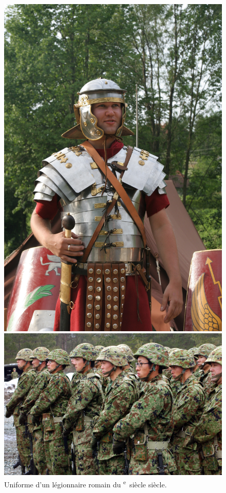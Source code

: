 \documentclass{article}
\newcommand{\cRM}[1]{\MakeUppercase{\romannumeral #1}}  %
\newcommand{\siecle}[1]{\cRM{#1}\textsuperscript{e}~siècle}
\begin{document}
\begin{center}
\begin{figure}[H]
\hfill
\begin{minipage}[H]{0.3\linewidth}
	\centering
	\includegraphics[width=\linewidth]{../ressources/Roman_soldier}
	\caption{Uniforme d'un légionnaire romain du \siecle{1} siècle. \cite{infantery}}
\end{minipage}
\hfill
\begin{minipage}[H]{0.6\linewidth}
	\centering
	\includegraphics[width=\linewidth]{../ressources/JGDSF_Soldiers}

\end{minipage}
\end{figure}
\end{center}
\end{document}
